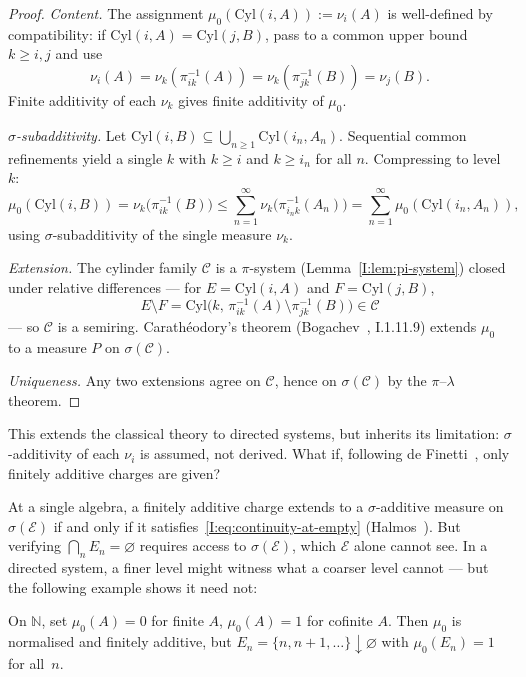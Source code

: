 \begin{proof}
\textit{Content.}
The assignment $\mu_0(\mathrm{Cyl}(i, A)) := \nu_i(A)$ is well-defined
by compatibility: if $\mathrm{Cyl}(i, A) = \mathrm{Cyl}(j, B)$, pass to
a common upper bound $k \geq i, j$ and use
\[
  \nu_i(A) = \nu_k(\pi_{ik}^{-1}(A)) = \nu_k(\pi_{jk}^{-1}(B)) = \nu_j(B).
\]
Finite additivity of each $\nu_k$ gives finite additivity of $\mu_0$.

\textit{$\sigma$-subadditivity.}
Let $\mathrm{Cyl}(i, B) \subseteq \bigcup_{n \geq 1}
\mathrm{Cyl}(i_n, A_n)$.  Sequential common refinements yield a single
$k$ with $k \geq i$ and $k \geq i_n$ for all $n$.  Compressing to
level $k$:
\[
  \mu_0(\mathrm{Cyl}(i, B))
  = \nu_k\!\bigl(\pi_{ik}^{-1}(B)\bigr)
  \leq \sum_{n=1}^\infty \nu_k\!\bigl(\pi_{i_n k}^{-1}(A_n)\bigr)
  = \sum_{n=1}^\infty \mu_0(\mathrm{Cyl}(i_n, A_n)),
\]
using $\sigma$-subadditivity of the single measure $\nu_k$.

\textit{Extension.}
The cylinder family $\mathcal{C}$ is a $\pi$-system
(Lemma~\ref{I:lem:pi-system}) closed under relative differences ---
for $E = \mathrm{Cyl}(i,A)$ and $F = \mathrm{Cyl}(j,B)$,
\[
  E \setminus F
  = \mathrm{Cyl}\!\bigl(k,\, \pi_{ik}^{-1}(A) \setminus
    \pi_{jk}^{-1}(B)\bigr) \in \mathcal{C}
\]
--- so $\mathcal{C}$ is a semiring.  Carath\'{e}odory's theorem
(Bogachev~\cite{Bogachev}, I.1.11.9) extends $\mu_0$ to a measure $P$
on $\sigma(\mathcal{C})$.

\textit{Uniqueness.}
Any two extensions agree on $\mathcal{C}$, hence on $\sigma(\mathcal{C})$
by the $\pi$--$\lambda$ theorem.
\end{proof}

\noindent This extends the classical theory to directed systems, but
inherits its limitation: $\sigma$-additivity of each $\nu_i$ is assumed,
not derived.  What if, following de Finetti~\cite{deFinetti1974},
only finitely additive charges are given?

At a single algebra,
a finitely additive charge extends to a $\sigma$-additive measure on
$\sigma(\mathcal{E})$ if and only if it
satisfies~\eqref{I:eq:continuity-at-empty}
(Halmos~\cite{Halmos1950}).  But verifying
$\bigcap_n E_n = \varnothing$ requires access to
$\sigma(\mathcal{E})$, which $\mathcal{E}$ alone cannot see.  In a
directed system, a finer level might witness what a coarser level
cannot --- but the following example shows it need not:

\begin{example}
\label{I:ex:finite-cofinite}
On $\mathbb{N}$, set $\mu_0(A) = 0$ for finite $A$,
$\mu_0(A) = 1$ for cofinite $A$.  Then $\mu_0$ is normalised and
finitely additive, but
$E_n = \{n, n{+}1, \ldots\} \downarrow \varnothing$ with
$\mu_0(E_n) = 1$ for all~$n$.
\end{example}

